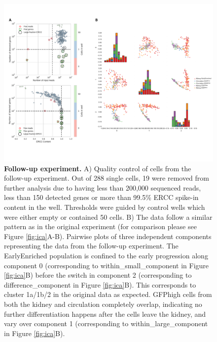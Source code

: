 \begin{figure}
    \centering
    \includegraphics[width=\textwidth]{"SF6"}
    \caption[Follow-up experiment]{\textbf{Follow-up experiment.} A) Quality control of cells from the follow-up experiment. Out of 288 single cells, 19 were removed from further analysis due to having less than 200,000 sequenced reads, less than 150 detected genes or more than 99.5\% ERCC spike-in content in the well. Thresholds were guided by control wells which were either empty or contained 50 cells. B) The data follow a similar pattern as in the original experiment (for comparison please see Figure \ref{fig:ica}A-B). Pairwise plots of three independent components representing the data from the follow-up experiment. The EarlyEnriched population is confined to the early progression along component 0 (corresponding to within\_small\_component in Figure \ref{fig:ica}B) before the switch in component 2 (corresponding to difference\_component in Figure \ref{fig:ica}B). This corresponds to cluster 1a/1b/2 in the original data as expected. GFPhigh cells from both the kidney and circulation completely overlap, indicating no further differentiation happens after the cells leave the kidney, and vary over component 1 (corresponding to within\_large\_component in Figure \ref{fig:ica}B).}
    \label{fig:rep-qc}
\end{figure}

